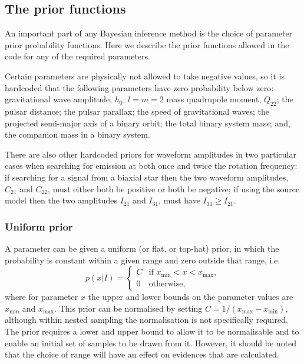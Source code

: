 \subsection{The prior functions}\label{sec:priorfuncs}

An important part of any Bayesian inference method is the choice of parameter prior probability functions. Here we describe the prior
functions allowed in the code for any of the required parameters.

Certain parameters are physically not allowed to take negative values, so it is hardcoded that the following parameters
have zero probability below zero: gravitational wave amplitude, $h_0$; $l=m=2$ mass quadrupole moment, $Q_{22}$; the pulsar
distance; the pulsar parallax; the speed of gravitational waves; the projected semi-major axis of a binary orbit; the total
binary system mass; and, the companion mass in a binary system.

There are also other hardcoded priors for waveform amplitudes in two particular cases when searching for emission at both once
and twice the rotation frequency: if searching for a signal from a biaxial star then the two waveform amplitudes, $C_{21}$ and $C_{22}$,
must either both be positive or both be negative; if using the source model then the two amplitudes $I_{21}$ and $I_{31}$, must
have $I_{31} \geqslant I_{21}$.

\subsubsection{Uniform prior}\label{sec:uniformprior}

A parameter can be given a uniform (or flat, or top-hat) prior, in which the probability is constant within a given
range and zero outside that range, i.e.
\begin{equation}
p(x|I) = \begin{cases}
             C & \text{if } x_{\text{min}} < x < x_{\text{max}}, \\
             0 & \text{otherwise},
            \end{cases}
\end{equation}
where for parameter $x$ the upper and lower bounds on the parameter values are $x_{\text{min}}$ and $x_{\text{max}}$. This
prior can be normalised by setting $C = 1/(x_{\text{max}}-x_{\text{min}})$, although within nested sampling the normalisation
is not specifically required. The prior requires a lower and upper bound to allow it to be normalisable and to enable
an initial set of samples to be drawn from it. However, it should be noted that the choice of range will have an
effect on evidences that are calculated.

